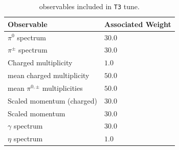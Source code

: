 \documentclass[aps,preprint,floatfix,nofootinbib,showpacs]{revtex4-1}
\begin{document}
 \begin{table}[tbp]
  \begin{center}
   \begin{tabular}{l|l}
    \hline 
    \hline
    Observable  \hspace{3cm} &  \hspace{1cm} Associated Weight \\ \hline
    $\pi^0$ spectrum & \hspace{3cm} $30.0$ \\ \hline
    $\pi^\pm$ spectrum & \hspace{3cm} $30.0$ \\ \hline
    Charged multiplicity &\hspace{3cm} $1.0$ \\ \hline
    mean charged multiplicity &\hspace{3cm} $50.0$ \\ \hline
    mean $\pi^{0,\pm}$ multiplicities & \hspace{3cm} $50.0$ \\ \hline
    Scaled momentum (charged) & \hspace{3cm} $30.0$ \\ \hline
    Scaled momentum & \hspace{3cm} $30.0$ \\ \hline
    $\gamma$ spectrum & \hspace{3cm} $30.0$ \\ \hline
    $\eta$ spectrum & \hspace{3cm} $1.0$ \\ \hline \hline
   \end{tabular}
  \end{center}
  \caption{observables included in \texttt{T3} tune.}
  \label{Tab5}
\end{table}
\end{document}
